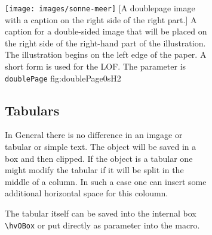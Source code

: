 \documentclass[twoside,paper=a4,usegeometry]{scrartcl}
\makeatletter
\let\hvBlindtext\Blindtext
\def\Blindtext{\par\color{black!40}\hvBlindtext\par\normalcolor}
\def\Lcs#1{\texttt{\textbackslash#1}\index{#1@\texttt{\textbackslash#1}}}
\makeatother
\begin{document}
\begin{figure}[p]
\begin{figure}[p]
\hvFloatSetDefaults

%
  {\texttt{[image: images/sonne-meer]}}%
  [A doublepage image with a caption on the right side of the right part.]%
  {A caption for a double-sided image that will be placed on the right side of the
   right-hand part of the illustration. The illustration begins on the left edge of 
   the paper. A short form is used for the LOF. 
   The parameter is \texttt{doublePage}}%
  {fig:doublePage0sH2}

\Blindtext

\Blindtext








\subsection{Tabulars}

In General there is no difference in an imgage or tabular or simple text. The object will be saved in a box and
then clipped. If the object is a tabular one might modify the tabular if it will be split in the middle of a
column. In such a case one can insert some additional horizontal space for this coloumn.

The tabular itself can be saved into the internal box \Lcs{hvOBox} or put directly as parameter into the 
macro.



\end{figure}
\end{figure}
\end{document}

